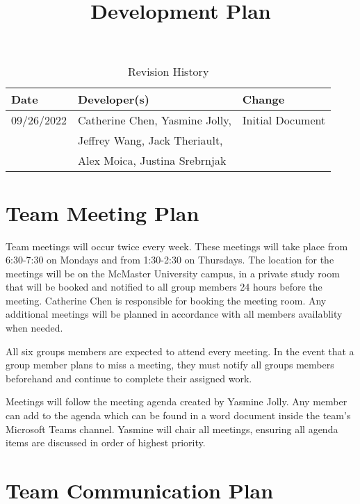 \documentclass{article}
\title{Development Plan\\\progname}
\author{\authname}
\date{}
\begin{document}
\begin{table}[hp]
\caption{Revision History} \label{TblRevisionHistory}
\begin{tabularx}{\textwidth}{llX}
\toprule
\textbf{Date} & \textbf{Developer(s)} & \textbf{Change}\\
\midrule
09/26/2022 & Catherine Chen, Yasmine Jolly, &Initial Document\\ 
&Jeffrey Wang, Jack Theriault, &\\
&Alex Moica, Justina Srebrnjak &\\
\bottomrule
\end{tabularx}
\end{table}

\newpage

\maketitle


\section{Team Meeting Plan}

Team meetings will occur twice every week. These meetings will take place from 6:30-7:30 on Mondays and from 1:30-2:30 on Thursdays. The location for the meetings will be on the McMaster University campus, in a private study room that will be booked and notified to all group members 24 hours before the meeting. Catherine Chen is responsible for booking the meeting room. Any additional meetings will be planned in accordance with all members availablity when needed.

All six groups members are expected to attend every meeting. In the event that a group member plans to miss a meeting, they must notify all groups members beforehand and continue to complete their assigned work.

Meetings will follow the meeting agenda created by Yasmine Jolly. Any member can add to the agenda which can be found in a word document inside the team's Microsoft Teams channel. Yasmine will chair all meetings, ensuring all agenda items are discussed in order of highest priority.

\section{Team Communication Plan}
\end{document}
